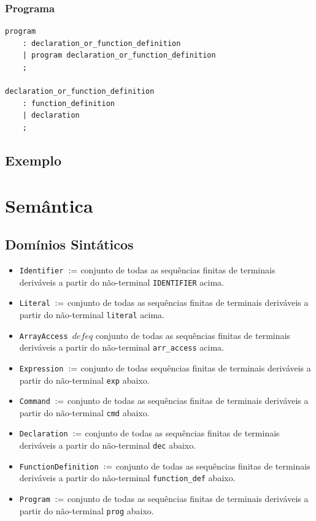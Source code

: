 \documentclass[12pt]{article}
\newcommand{\red}{\textcolor{red}}
\newcommand\todo[1]{\red{\Large \text{TODO: #1}}}
\newcommand{\defeq}{\vcentcolon=}
\begin{document}
\subsubsection{Programa}
\begin{verbatim}
program
    : declaration_or_function_definition
    | program declaration_or_function_definition
    ;

declaration_or_function_definition
    : function_definition
    | declaration
    ;

\end{verbatim}
\subsection{Exemplo}
\todo{EXEMPLO}
\section{Semântica}

\subsection{Domínios Sintáticos}

\begin{itemize}
\item {\tt Identifier $\defeq$} conjunto de todas as sequências finitas de terminais deriváveis a partir do não-terminal {\tt IDENTIFIER} acima.

\item {\tt Literal $\defeq$} conjunto de todas as sequências finitas de terminais deriváveis a partir do não-terminal {\tt literal} acima.

\item {\tt ArrayAccess $defeq$} conjunto de todas as sequências finitas de terminais deriváveis a partir do não-terminal {\tt arr\_access} acima.

\item {\tt Expression $\defeq$} conjunto de todas sequências finitas de terminais deriváveis a partir do não-terminal {\tt exp} abaixo.

\item {\tt Command $\defeq$} conjunto de todas as sequências finitas de terminais deriváveis a partir do não-terminal {\tt cmd} abaixo.

\item {\tt Declaration $\defeq$} conjunto de todas as sequências finitas de terminais deriváveis a partir do não-terminal {\tt dec} abaixo.

\item {\tt FunctionDefinition $\defeq$} conjunto de todas as sequências finitas de terminais deriváveis a partir do não-terminal {\tt function\_def} abaixo.

\item {\tt Program $\defeq$} conjunto de todas as sequências finitas de terminais deriváveis a partir do não-terminal {\tt prog} abaixo.

\end{itemize}
\end{document}
